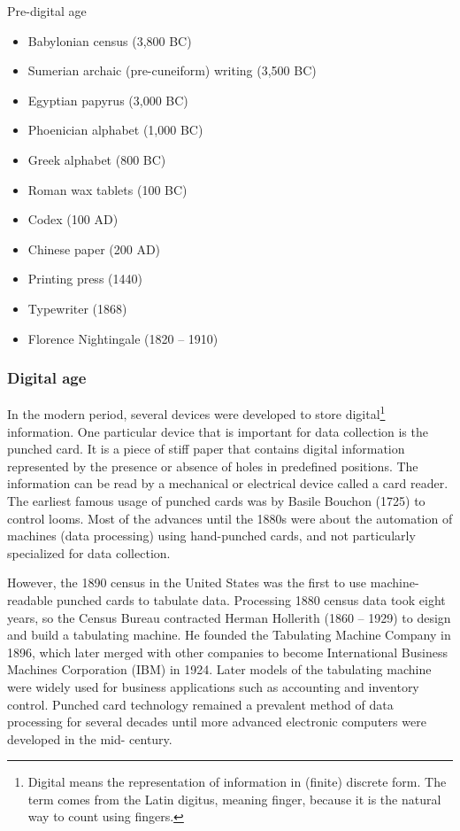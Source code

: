 \begin{slidebox}{Pre-digital age}{}
  \begin{itemize}
    \item Babylonian census (3,800 BC)
    \item Sumerian archaic (pre-cuneiform) writing (3,500 BC)
    \item Egyptian papyrus (3,000 BC)
    \item Phoenician alphabet (1,000 BC)
    \item Greek alphabet (800 BC)
    \item Roman wax tablets (100 BC)
    \item Codex (100 AD)
    \item Chinese paper (200 AD)
    \item Printing press (1440)
    \item Typewriter (1868)
    \item Florence Nightingale (1820 -- 1910)
  \end{itemize}
\end{slidebox}

\subsubsection{Digital age}

In the modern period, several devices were developed to store digital\footnote{Digital
means the representation of information in (finite) discrete form.  The term comes from the Latin
digitus, meaning finger, because it is the natural way to count using fingers.}
information.  One particular device that is important for data collection is the punched
card.  It is a piece of stiff paper that contains digital information represented by the
presence or absence of holes in predefined positions.  The information can be read by a
mechanical or electrical device called a card reader.  The earliest famous usage of
punched cards was by Basile Bouchon (1725) to control looms.  Most of the advances until
the 1880s were about the automation of machines (data processing) using hand-punched cards, and not
particularly specialized for data collection.

However, the 1890 census in the United States was the first to use machine-readable
punched cards to tabulate data. Processing 1880 census data took eight years, so the
Census Bureau contracted Herman Hollerith (1860 -- 1929) to design and build a tabulating
machine.  He founded the Tabulating Machine Company in 1896, which later merged with other
companies to become International Business Machines Corporation (IBM) in 1924. Later
models of the tabulating machine were widely used for business applications such as
accounting and inventory control. Punched card technology remained a prevalent method of
data processing for several decades until more advanced electronic computers were
developed in the mid- century.

